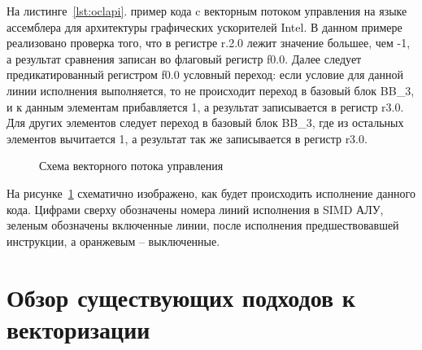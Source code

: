 На листинге~\cref{lst:oclapi}. пример кода c векторным потоком управления на языке ассемблера для архитектуры графических ускорителей Intel. В данном примере реализовано проверка того, что в регистре r.2.0 лежит значение большее, чем -1, а результат сравнения записан во флаговый регистр f0.0. Далее следует предикатированный регистром f0.0 условный переход: если условие для данной линии исполнения выполняется, то не происходит переход в базовый блок BB\_3, и к данным элементам прибавляется 1, а результат записывается в регистр r3.0. Для других элементов следует переход в базовый блок BB\_3, где из остальных элементов вычитается 1, а результат так же записывается в регистр r3.0.

\begin{figure}[ht]
    \caption{Схема векторного потока управления}\label{fig:HW-goto-example}
\end{figure}

На рисунке~\ref{fig:HW-goto-example} схематично изображено, как будет происходить исполнение данного кода. Цифрами сверху обозначены номера линий исполнения в SIMD АЛУ, зеленым обозначены включенные линии, после исполнения предшествовавшей инструкции, а оранжевым -- выключенные.

\section{Обзор существующих подходов к векторизации}\label{sec:overview/vectorizing}

